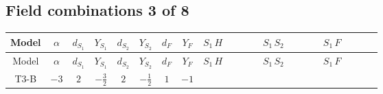 \documentclass[8pt]{article}
\begin{document}
\begin{landscape}
\subsection*{Field combinations 3 of 8}
\begin{longtable}{@{}cccccccc >{\raggedright\arraybackslash}p{0.21\linewidth} >{\raggedright\arraybackslash}p{0.21\linewidth} >{\raggedright\arraybackslash}p{0.21\linewidth}@{}}
\toprule
Model & $\alpha$ & $d_{S_1}$ & $Y_{S_1}$ & $d_{S_2}$ & $Y_{S_2}$ & $d_F$ & $Y_F$ & $S_1\,H$ & $S_1\,S_2$ & $S_1\,F$ \\
\midrule
\endfirsthead
\toprule
Model & $\alpha$ & $d_{S_1}$ & $Y_{S_1}$ & $d_{S_2}$ & $Y_{S_2}$ & $d_F$ & $Y_F$ & $S_1\,H$ & $S_1\,S_2$ & $S_1\,F$ \\
\midrule
\endhead
T3-B & $-3$ & $2$ & $-\frac{3}{2}$ & $2$ & $-\frac{1}{2}$ & $1$ & $-1$ & \scriptsize\adjustbox{max width=\linewidth}{$\begin{gathered} -\frac{2 \hbar  \overline{y_{1,i_1,r_1}} \overline{Y_{e,i_2,i_3}} H_{a_2} S_{1,j_2} y_{1,i_2,r_1} Y_{e,i_1,i_3} \mathcal{I}_{y_1,a_1,j_2} {\mathcal{C}_{LS_1F}}^{*}_{a_2,j_1} H_{a_1}{}^{\dagger } S_{1,j_1}{}^{\dagger }}{\epsilon } \\ -2 \hbar  \overline{y_{1,i_1,r_1}} \overline{Y_{e,i_2,i_3}} H_{a_2} S_{1,j_2} y_{1,i_2,r_1} Y_{e,i_1,i_3} \mathcal{I}_{y_1,a_1,j_2} {\mathcal{C}_{LS_1F}}^{*}_{a_2,j_1} H_{a_1}{}^{\dagger } S_{1,j_1}{}^{\dagger } \\ +H_{a_2} S_{1,j_2} H_{a_1}{}^{\dagger } S_{1,j_1}{}^{\dagger } \mathcal{I}_{H1,a_1,a_2,j_1,j_2}{}^1 \lambda_{HS_1}^{(1)}^{(1)}\end{gathered}$} & \scriptsize\adjustbox{max width=\linewidth}{$\begin{gathered} +\frac{2 \hbar  \overline{y_{1,i_1,r_1}} \overline{y_{2,i_2,r_2}} S_{1,j_2} S_{2,j_1} y_{1,i_2,r_1} y_{2,i_1,r_2} S_{1,j_1}{}^{\dagger } S_{2,j_2}{}^{\dagger }}{\epsilon } \\ -\frac{2 \hbar  \overline{y_{1,i_1,r_1}} \overline{y_{2,i_2,r_2}} S_{1,j_1} S_{2,j_2} y_{1,i_2,r_1} y_{2,i_1,r_2} S_{1,j_1}{}^{\dagger } S_{2,j_2}{}^{\dagger }}{\epsilon } \\ -2 \hbar  \overline{y_{1,i_1,r_1}} \overline{y_{2,i_2,r_1}} S_{1,j_2} S_{2,j_1} y_{1,i_2,r_2} y_{2,i_1,r_2} S_{1,j_1}{}^{\dagger } S_{2,j_2}{}^{\dagger }\end{gathered}$} & \scriptsize\adjustbox{max width=\linewidth}{$\begin{gathered} +C_{S_1^\dagger S_1} \hbar  \log \left(\frac{\bar{\mu}^{2}}{M_F^2}\right) \overline{y_{1,i_1,r_1}} S_{1,j_1} y_{1,i_1,r_1} S_{1,j_1}{}^{\dagger } \\ -\hbar  \log \left(\frac{\bar{\mu}^{2}}{M_F^2}\right) \overline{y_{1,i_1,r_1}} \overline{y_{1,i_2,r_2}} S_{1,j_1} S_{1,j_2} y_{1,i_1,r_2} y_{1,i_2,r_1} S_{1,j_1}{}^{\dagger } S_{1,j_2}{}^{\dagger } \\ -\hbar  \log \left(\frac{\bar{\mu}^{2}}{M_F^2}\right) \overline{y_{1,i_1,r_1}} S_{1,j_3} S_{1,j_4} y_{1,i_1,r_1} S_{1,j_1}{}^{\dagger } S_{1,j_2}{}^{\dagger } \mathcal{I}_{S_1,j_1,j_3,j_2,j_4}{}^1 \lambda_{S_1}^{(1)}^{(1)}\end{gathered}$} \\

\end{longtable}
\end{landscape}
\end{document}
